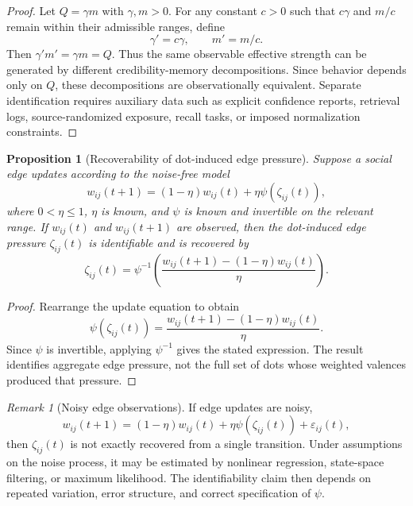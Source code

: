 \documentclass[11pt]{article}
\newtheorem{proposition}{Proposition}
\theoremstyle{remark}
\newtheorem{remark}{Remark}
\begin{document}
\begin{proof}
Let $Q=\gamma m$ with $\gamma,m>0$. For any constant $c>0$ such that
$c\gamma$ and $m/c$ remain within their admissible ranges, define
$$
\gamma'=c\gamma,
\qquad
m'=m/c.
$$
Then $\gamma'm'=\gamma m=Q$. Thus the same observable effective strength
can be generated by different credibility-memory decompositions. Since
behavior depends only on $Q$, these decompositions are observationally
equivalent. Separate identification requires auxiliary data such as
explicit confidence reports, retrieval logs, source-randomized exposure,
recall tasks, or imposed normalization constraints.
\end{proof}

\begin{proposition}[Recoverability of dot-induced edge pressure]\label{prop:edge-pressure-recoverability}
Suppose a social edge updates according to the noise-free model
$$
w_{ij}(t+1)=(1-\eta)w_{ij}(t)+\eta\psi(\zeta_{ij}(t)),
$$
where $0<\eta\leq1$, $\eta$ is known, and $\psi$ is known and invertible
on the relevant range. If $w_{ij}(t)$ and $w_{ij}(t+1)$ are observed,
then the dot-induced edge pressure $\zeta_{ij}(t)$ is identifiable and is
recovered by
$$
\zeta_{ij}(t)=\psi^{-1}\left(\frac{w_{ij}(t+1)-(1-\eta)w_{ij}(t)}{\eta}\right).
$$
\end{proposition}

\begin{proof}
Rearrange the update equation to obtain
$$
\psi(\zeta_{ij}(t))=\frac{w_{ij}(t+1)-(1-\eta)w_{ij}(t)}{\eta}.
$$
Since $\psi$ is invertible, applying $\psi^{-1}$ gives the stated
expression. The result identifies aggregate edge pressure, not the full
set of dots whose weighted valences produced that pressure.
\end{proof}

\begin{remark}[Noisy edge observations]
If edge updates are noisy,
$$
w_{ij}(t+1)=(1-\eta)w_{ij}(t)+\eta\psi(\zeta_{ij}(t))+\varepsilon_{ij}(t),
$$
then $\zeta_{ij}(t)$ is not exactly recovered from a single transition.
Under assumptions on the noise process, it may be estimated by nonlinear
regression, state-space filtering, or maximum likelihood. The
identifiability claim then depends on repeated variation, error
structure, and correct specification of $\psi$.
\end{remark}
\end{document}
